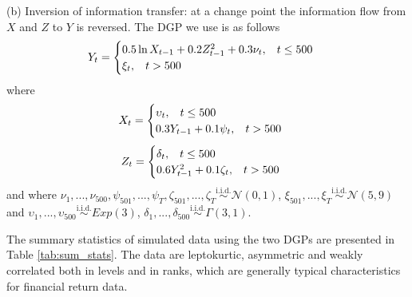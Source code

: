 (b) Inversion of information transfer: at a change point the information flow from $X$ and $Z$ to $Y$ is reversed. The DGP we use is as follows
\begin{equation*} Y_t = 
    \begin{cases}
      0.5 \ln X_{t-1} + 0.2Z_{t-1}^2 + 0.3 \nu_t, \hspace{0.3cm} t \leq 500\\
      \xi_t, \hspace{0.3cm} t > 500
    \end{cases}\,
\end{equation*}
where 
\begin{equation*} X_t = 
    \begin{cases}
      \upsilon_t, \hspace{0.3cm} t \leq 500\\
      0.3Y_{t-1} + 0.1 \psi_t, \hspace{0.3cm} t > 500
    \end{cases}\,
\end{equation*}
\begin{equation*} Z_t = 
    \begin{cases}
      \delta_t, \hspace{0.3cm} t \leq 500\\
      0.6Y_{t-1}^2 + 0.1 \zeta_t, \hspace{0.3cm} t > 500
    \end{cases}\,
\end{equation*}
and where $\nu_1, ... , \nu_{500}, \psi_{501}, ..., \psi_{T}, \zeta_{501}, ..., \zeta_{T} \overset{\mathrm{i.i.d.}}{\sim} \mathcal{N}(0,1)$, $\xi_{501}, ... , \xi_{T} \overset{\mathrm{i.i.d.}}{\sim} \mathcal{N}(5,9)$ and $    \upsilon_1, ... , \upsilon_{500}  \overset{\mathrm{i.i.d.}}{\sim} Exp(3)
$, $\delta_1, ... , \delta_{500}  \overset{\mathrm{i.i.d.}}{\sim} \Gamma(3,1)$.

The summary statistics of simulated data using the two DGPs are presented in Table \ref{tab:sum_stats}. The data are leptokurtic, asymmetric and weakly correlated both in levels and in ranks, which are generally typical characteristics for financial return data. 

